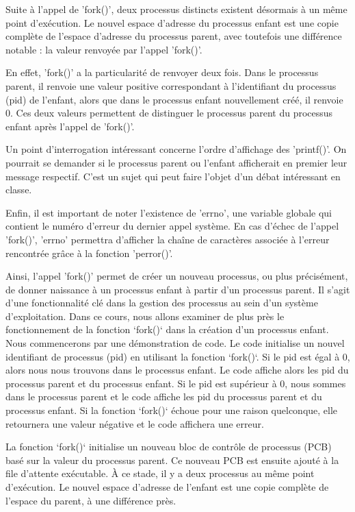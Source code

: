 \documentclass[12pt]{article}
\begin{document}
Suite à l'appel de 'fork()', deux processus distincts existent désormais à un même point d'exécution. Le nouvel espace d'adresse du processus enfant est une copie complète de l'espace d'adresse du processus parent, avec toutefois une différence notable : la valeur renvoyée par l'appel 'fork()'. 

En effet, 'fork()' a la particularité de renvoyer deux fois. Dans le processus parent, il renvoie une valeur positive correspondant à l'identifiant du processus (pid) de l'enfant, alors que dans le processus enfant nouvellement créé, il renvoie 0. Ces deux valeurs permettent de distinguer le processus parent du processus enfant après l'appel de 'fork()'. 

Un point d'interrogation intéressant concerne l'ordre d'affichage des 'printf()'. On pourrait se demander si le processus parent ou l'enfant afficherait en premier leur message respectif. C'est un sujet qui peut faire l'objet d'un débat intéressant en classe.

Enfin, il est important de noter l'existence de 'errno', une variable globale qui contient le numéro d'erreur du dernier appel système. En cas d'échec de l'appel 'fork()', 'errno' permettra d'afficher la chaîne de caractères associée à l'erreur rencontrée grâce à la fonction 'perror()'. 

Ainsi, l'appel 'fork()' permet de créer un nouveau processus, ou plus précisément, de donner naissance à un processus enfant à partir d'un processus parent. Il s'agit d'une fonctionnalité clé dans la gestion des processus au sein d'un système d'exploitation.
Dans ce cours, nous allons examiner de plus près le fonctionnement de la fonction `fork()` dans la création d'un processus enfant. Nous commencerons par une démonstration de code. Le code initialise un nouvel identifiant de processus (pid) en utilisant la fonction `fork()`. Si le pid est égal à 0, alors nous nous trouvons dans le processus enfant. Le code affiche alors les pid du processus parent et du processus enfant. Si le pid est supérieur à 0, nous sommes dans le processus parent et le code affiche les pid du processus parent et du processus enfant. Si la fonction `fork()` échoue pour une raison quelconque, elle retournera une valeur négative et le code affichera une erreur.

La fonction `fork()` initialise un nouveau bloc de contrôle de processus (PCB) basé sur la valeur du processus parent. Ce nouveau PCB est ensuite ajouté à la file d'attente exécutable. À ce stade, il y a deux processus au même point d'exécution. Le nouvel espace d'adresse de l'enfant est une copie complète de l'espace du parent, à une différence près. 
\end{document}
